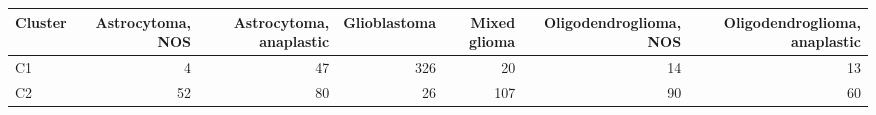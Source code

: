 \begin{tabular}{lrrrrrr}
\toprule
\textbf{Cluster} & \textbf{Astrocytoma, NOS} & \textbf{Astrocytoma, anaplastic} & \textbf{Glioblastoma} & \textbf{Mixed glioma} & \textbf{Oligodendroglioma, NOS} & \textbf{Oligodendroglioma, anaplastic} \\
\midrule
C1 & 4 & 47 & 326 & 20 & 14 & 13 \\
C2 & 52 & 80 & 26 & 107 & 90 & 60 \\
\bottomrule
\end{tabular}
